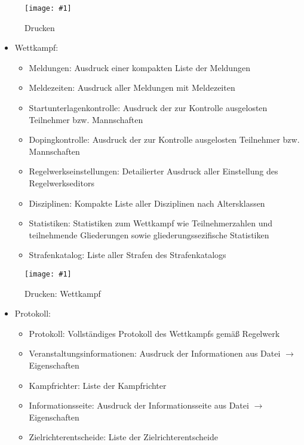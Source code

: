 \documentclass[11pt,a4paper,twoside,ngerman]{article}
\newcommand{\hsmimage}[3]{\begin{figure}[!ht]\centering\texttt{[image: \#1]}\caption{#3}\end{figure}}
\begin{document}
\hsmimage{pics/panel-drucken}{.65\textwidth}{Drucken}

\begin{itemize}

\item Wettkampf:
\begin{itemize}

\item Meldungen: Ausdruck einer kompakten Liste der Meldungen


\item Meldezeiten: Ausdruck aller Meldungen mit Meldezeiten


\item Startunterlagenkontrolle: Ausdruck der zur Kontrolle ausgelosten Teilnehmer bzw. Mannschaften


\item Dopingkontrolle: Ausdruck der zur Kontrolle ausgelosten Teilnehmer bzw. Mannschaften


\item Regelwerkseinstellungen: Detailierter Ausdruck aller Einstellung des Regelwerkseditors


\item Disziplinen: Kompakte Liste aller Disziplinen nach Altersklassen


\item Statistiken: Statistiken zum Wettkampf wie Teilnehmerzahlen und teilnehmende Gliederungen sowie gliederungssezifische Statistiken


\item Strafenkatalog: Liste aller Strafen des Strafenkatalogs


\end{itemize}



\end{itemize}

\hsmimage{pics/panel-drucken-wettkampf}{.80\textwidth}{Drucken: Wettkampf}

\begin{itemize}

\item Protokoll:
\begin{itemize}

\item Protokoll: Vollständiges Protokoll des Wettkampfs gemäß Regelwerk


\item Veranstaltungsinformationen: Ausdruck der Informationen aus \glqq{}Datei\grqq{} \ensuremath{\rightarrow} \glqq{}Eigenschaften\grqq{}


\item Kampfrichter: Liste der Kampfrichter


\item Informationsseite: Ausdruck der Informationsseite aus \glqq{}Datei\grqq{} \ensuremath{\rightarrow} \glqq{}Eigenschaften\grqq{}


\item Zielrichterentscheide: Liste der Zielrichterentscheide


\end{itemize}



\end{itemize}
\end{document}
